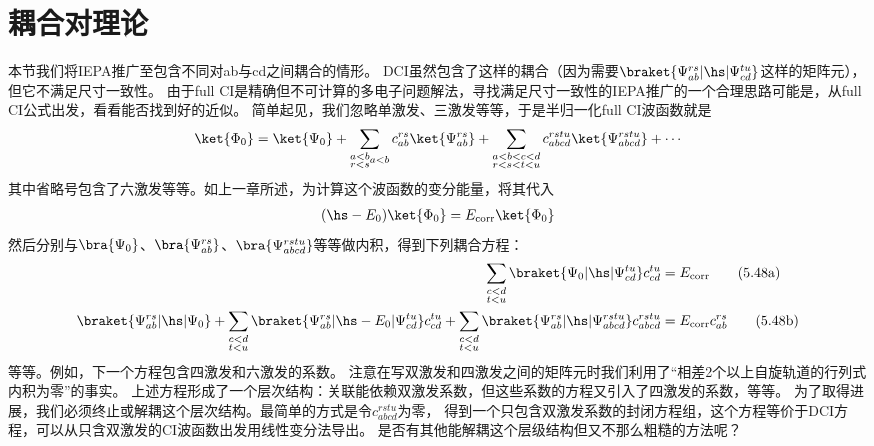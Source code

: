 \section{耦合对理论}
本节我们将IEPA推广至包含不同对ab与cd之间耦合的情形。
DCI虽然包含了这样的耦合（因为需要$\braket{\Psi^{rs}_{ab}|\hs|\Psi^{tu}_{cd}}$这样的矩阵元），但它不满足尺寸一致性。
由于full CI是精确但不可计算的多电子问题解法，寻找满足尺寸一致性的IEPA推广的一个合理思路可能是，从full CI公式出发，看看能否找到好的近似。
简单起见，我们忽略单激发、三激发等等，于是半归一化full CI波函数就是
\begin{align}
\ket{\Phi_0} = \ket{\Psi_0} + \sum_{\substack{a<b\\r<s}a<b}c_{ab}^{rs}\ket{\Psi_{ab}^{rs}}+\sum_{\substack{a<b<c<d\\r<s<t<u}}c_{abcd}^{rstu}\ket{\Psi_{abcd}^{rstu}}+\cdots
\end{align}
其中省略号包含了六激发等等。如上一章所述，为计算这个波函数的变分能量，将其代入
\begin{align}
(\hs-E_0)\ket{\Phi_0} = E_\text{corr}\ket{\Phi_0}
\end{align}
然后分别与$\bra{\Psi_0}$、$\bra{\Psi_{ab}^{rs}}$、$\bra{\Psi_{abcd}^{rstu}}$等等做内积，得到下列耦合方程：
\begin{subequations}
    \begin{align}
        \sum_{\substack{c<d\\t<u}}\braket{\Psi_0|\hs|\Psi_{cd}^{tu}}c_{cd}^{tu}&=E_\text{corr}\tag{5.48a}\label{5.48a}\\
        \braket{\Psi_{ab}^{rs}|\hs|\Psi_0}+\sum_{\substack{c<d\\t<u}}\braket{\Psi_{ab}^{rs}|\hs-E_0|\Psi_{cd}^{tu}}c_{cd}^{tu}
        +\sum_{\substack{c<d\\t<u}}\braket{\Psi_{ab}^{rs}|\hs|\Psi_{abcd}^{rstu}}c^{rstu}_{abcd}&=E_\text{corr}c_{ab}^{rs}\tag{5.48b}\label{5.48b}
        \end{align}
\end{subequations}
等等。例如，下一个方程包含四激发和六激发的系数。
注意在写双激发和四激发之间的矩阵元时我们利用了“相差2个以上自旋轨道的行列式内积为零”的事实。
上述方程形成了一个层次结构：关联能依赖双激发系数，但这些系数的方程又引入了四激发的系数，等等。
为了取得进展，我们必须终止或解耦这个层次结构。最简单的方式是令$c_{abcd}^{rstu}$为零，
得到一个只包含双激发系数的封闭方程组，这个方程等价于DCI方程，可以从只含双激发的CI波函数出发用线性变分法导出。
是否有其他能解耦这个层级结构但又不那么粗糙的方法呢？
